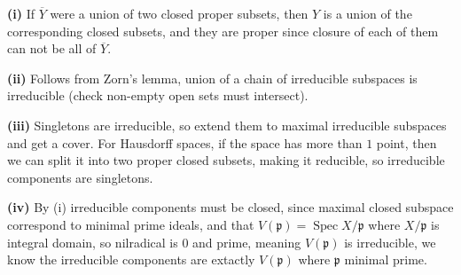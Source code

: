 \textbf{(i)} If $\overline Y$ were a union of two closed proper subsets, then $Y$ is a union of the corresponding closed subsets, and they are proper since closure of each of them can not be all of $\overline Y$.

\textbf{(ii)} Follows from Zorn's lemma, union of a chain of irreducible subspaces is irreducible (check non-empty open sets must intersect).

\textbf{(iii)} Singletons are irreducible, so extend them to maximal irreducible subspaces and get a cover. For Hausdorff spaces, if the space has more than $1$ point, then we can split it into two proper closed subsets, making it reducible, so irreducible components are singletons.

\textbf{(iv)} By (i) irreducible components must be closed, since maximal closed subspace correspond to minimal prime ideals, and that $V(\mathfrak p)=\operatorname{Spec}X/\mathfrak p$ where $X/\mathfrak p$ is integral domain, so nilradical is $0$ and prime, meaning $V(\mathfrak p)$ is irreducible, we know the irreducible components are extactly $V(\mathfrak p)$ where $\mathfrak p$ minimal prime.
